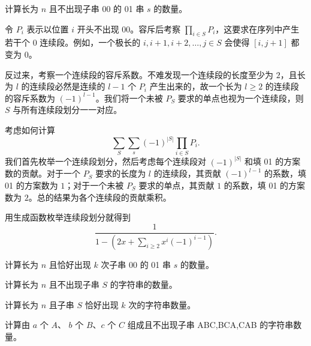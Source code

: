 \begin{example}
    计算长为 $n$ 且不出现子串 00 的 01 串 $s$ 的数量。
\end{example}
\begin{solution}
    令 $P_i$ 表示以位置 $i$ 开头不出现 00。容斥后考察 $\prod_{i\in S}P_i$，这要求在序列中产生若干个 $0$ 连续段。例如，一个极长的 $i,i+1,i+2,\ldots,j\in S$ 会使得 $[i,j+1]$ 都变为 $0$。
    
    反过来，考察一个连续段的容斥系数。不难发现一个连续段的长度至少为 $2$，且长为 $l$ 的连续段必然是连续的 $l-1$ 个 $P_i$ 产生出来的，故一个长为 $l\ge 2$ 的连续段的容斥系数为 $(-1)^{l-1}$。我们将一个未被 $P_S$ 要求的单点也视为一个连续段，则 $S$ 与所有连续段划分一一对应。
    
    考虑如何计算 
    $$
    \sum_S \sum_s (-1)^{|S|}\prod_{i\in S}P_i.
    $$
    我们首先枚举一个连续段划分，然后考虑每个连续段对 $(-1)^{|S|}$ 和填 01 的方案数的贡献。对于一个 $P_S$ 要求的长度为 $l$ 的连续段，其贡献 $(-1)^{l-1}$ 的系数，填 01 的方案数为 $1$；对于一个未被 $P_S$ 要求的单点，其贡献 $1$ 的系数，填 01 的方案数为 $2$。总的结果为各个连续段的贡献乘积。

    用生成函数枚举连续段划分就得到
    $$
    \frac{1}{1-\left(2x+\sum_{i\ge 2}x^i(-1)^{i-1}\right)}.
    $$
\end{solution}
\begin{exercise}
    计算长为 $n$ 且恰好出现 $k$ 次子串 00 的 01 串 $s$ 的数量。
\end{exercise}

\begin{exercise}
    计算长为 $n$ 且不出现子串 $S$ 的字符串的数量。
\end{exercise}
\begin{exercise}
    计算长为 $n$ 且子串 $S$ 恰好出现 $k$ 次的字符串数量。
\end{exercise}

\begin{exercise}
    计算由 $a$ 个 $A$、 $b$ 个 $B$、$c$ 个 $C$ 组成且不出现子串 ABC,BCA,CAB 的字符串数量。
\end{exercise}

